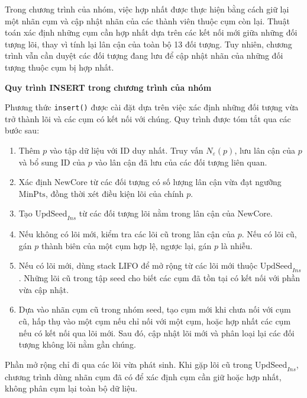 Trong chương trình của nhóm, việc hợp nhất được thực hiện bằng cách giữ lại một nhãn cụm và cập nhật nhãn của các thành viên thuộc cụm còn lại. Thuật toán xác định những cụm cần hợp nhất dựa trên các kết nối mới giữa những đối tượng lõi, thay vì tính lại lân cận của toàn bộ 13 đối tượng. Tuy nhiên, chương trình vẫn cần duyệt các đối tượng đang lưu để cập nhật nhãn của những đối tượng thuộc cụm bị hợp nhất.

\textbf{Quy trình INSERT trong chương trình của nhóm}

Phương thức \texttt{insert()}  được cài đặt dựa trên việc xác định những đối tượng vừa trở thành lõi và các cụm có kết nối với chúng. Quy trình được tóm tắt qua các bước sau:

\begin{enumerate}[label=\textbf{Bước \arabic*.}, leftmargin=*, itemsep=4pt]
    \item Thêm \(p\) vào tập dữ liệu với ID duy nhất. Truy vấn \(N_{\varepsilon}(p)\), lưu lân cận của \(p\) và bổ sung ID của \(p\) vào lân cận đã lưu của các đối tượng liên quan.

    \item Xác định \(\mathrm{NewCore}\) từ các đối tượng có số lượng lân cận vừa đạt ngưỡng \(\mathrm{MinPts}\), đồng thời xét điều kiện lõi của chính \(p\).

    \item Tạo \(\mathrm{UpdSeed}_{Ins}\) từ các đối tượng lõi nằm trong lân cận của \(\mathrm{NewCore}\).

    \item Nếu không có lõi mới, kiểm tra các lõi cũ trong lân cận của \(p\). Nếu có lõi cũ, gán \(p\) thành biên của một cụm hợp lệ, ngược lại, gán \(p\) là nhiễu.

    \item Nếu có lõi mới, dùng stack LIFO để mở rộng từ các lõi mới thuộc \(\mathrm{UpdSeed}_{Ins}\). Những lõi cũ trong tập seed cho biết các cụm đã tồn tại có kết nối với phần vừa cập nhật.

    \item Dựa vào nhãn cụm cũ trong nhóm seed, tạo cụm mới khi chưa nối với cụm cũ, hấp thụ vào một cụm nếu chỉ nối với một cụm, hoặc hợp nhất các cụm nếu có kết nối qua lõi mới. Sau đó, cập nhật lõi mới và phân loại lại các đối tượng không lõi nằm gần chúng.
\end{enumerate}

Phần mở rộng chỉ đi qua các lõi vừa phát sinh. Khi gặp lõi cũ trong \(\mathrm{UpdSeed}_{Ins}\), chương trình dùng nhãn cụm đã có để xác định cụm cần giữ hoặc hợp nhất, không phân cụm lại toàn bộ dữ liệu.

